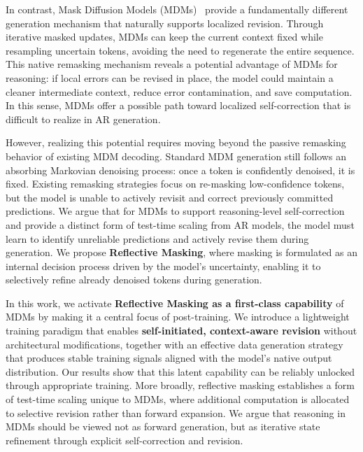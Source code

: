 \documentclass{llmxive}
\providecommand{\methodfull}{Reflective Masking\xspace}
\begin{document}
In contrast, Mask Diffusion Models (MDMs)~\citep{austin2021structured, sahoo2024simple, nie2025large, xin2025lumina} provide a fundamentally different generation mechanism that naturally supports localized revision. Through iterative masked updates, MDMs can keep the current context fixed while resampling uncertain tokens, avoiding the need to regenerate the entire sequence. This native remasking mechanism reveals a potential advantage of MDMs for reasoning: if local errors can be revised in place, the model could maintain a cleaner intermediate context, reduce error contamination, and save computation. In this sense, MDMs offer a possible path toward localized self-correction that is difficult to realize in AR generation. 

However, realizing this potential requires moving beyond the passive remasking behavior of existing MDM decoding. Standard MDM generation still follows an absorbing Markovian denoising process: once a token is confidently denoised, it is fixed. Existing remasking strategies focus on re-masking low-confidence tokens, but the model is unable to actively revisit and correct previously committed predictions. We argue that for MDMs to support reasoning-level self-correction and provide a distinct form of test-time scaling from AR models, the model must learn to identify unreliable predictions and actively revise them during generation. We propose \textbf{\methodfull}, where masking is formulated as an internal decision process driven by the model's uncertainty, enabling it to selectively refine already denoised tokens during generation.

In this work, we activate \textbf{\methodfull as a first-class capability} of MDMs by making it a central focus of post-training. We introduce a lightweight training paradigm that enables \textbf{self-initiated, context-aware revision} without architectural modifications, together with an effective data generation strategy that produces stable training signals aligned with the model’s native output distribution. Our results show that this latent capability can be reliably unlocked through appropriate training. More broadly, reflective masking establishes a form of test-time scaling unique to MDMs, where additional computation is allocated to selective revision rather than forward expansion. We argue that reasoning in MDMs should be viewed not as forward generation, but as iterative state refinement through explicit self-correction and revision.
\end{document}
